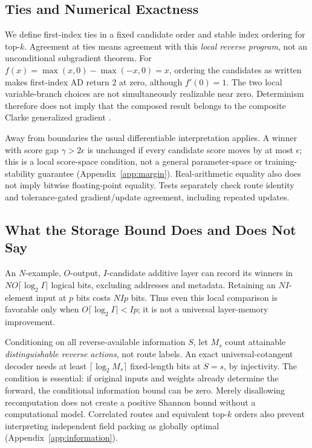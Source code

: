 \documentclass{article}
\theoremstyle{plain}
\theoremstyle{definition}
\theoremstyle{remark}
\begin{document}
\subsection{Ties and Numerical Exactness}

We define first-index ties in a fixed candidate order and stable index
ordering for top-$k$. Agreement at ties means agreement with this
\emph{local reverse program}, not an unconditional subgradient theorem.
For $f(x)=\max(x,0)-\max(-x,0)=x$, ordering the candidates as written makes
first-index AD return $2$ at zero, although $f'(0)=1$.
The two local variable-branch choices are not simultaneously realizable
near zero. Determinism therefore does not imply that the composed result
belongs to the composite Clarke generalized gradient
\citep{bolte2020model,bolte2023nonsmooth}.

Away from boundaries the usual differentiable interpretation applies.
A winner with score gap $\gamma>2\epsilon$ is unchanged if every candidate
score moves by at most $\epsilon$; this is a local score-space condition,
not a general parameter-space or training-stability guarantee
(Appendix~\ref{app:margin}). Real-arithmetic equality also does not imply
bitwise floating-point equality. Tests separately check route identity and
tolerance-gated gradient/update agreement, including repeated updates.

\subsection{What the Storage Bound Does and Does Not Say}

An $N$-example, $O$-output, $I$-candidate additive layer can record its winners
in $NO\lceil\log_2 I\rceil$ logical bits, excluding addresses and metadata.
Retaining an $NI$-element input at $p$ bits costs $NIp$ bits. Thus even this
local comparison is favorable only when
$O\lceil\log_2 I\rceil<Ip$; it is not a universal layer-memory improvement.

Conditioning on all reverse-available information $S$, let $M_s$ count
attainable \emph{distinguishable reverse actions}, not route labels. An
exact universal-cotangent decoder needs at least
$\lceil\log_2M_s\rceil$ fixed-length bits at $S=s$, by injectivity.
The condition is essential: if original inputs and weights already
determine the forward, the conditional information bound can be zero.
Merely disallowing recomputation does not create a positive Shannon bound
without a computational model. Correlated routes and equivalent top-$k$
orders also prevent interpreting independent field packing as globally
optimal (Appendix~\ref{app:information}).
\end{document}
